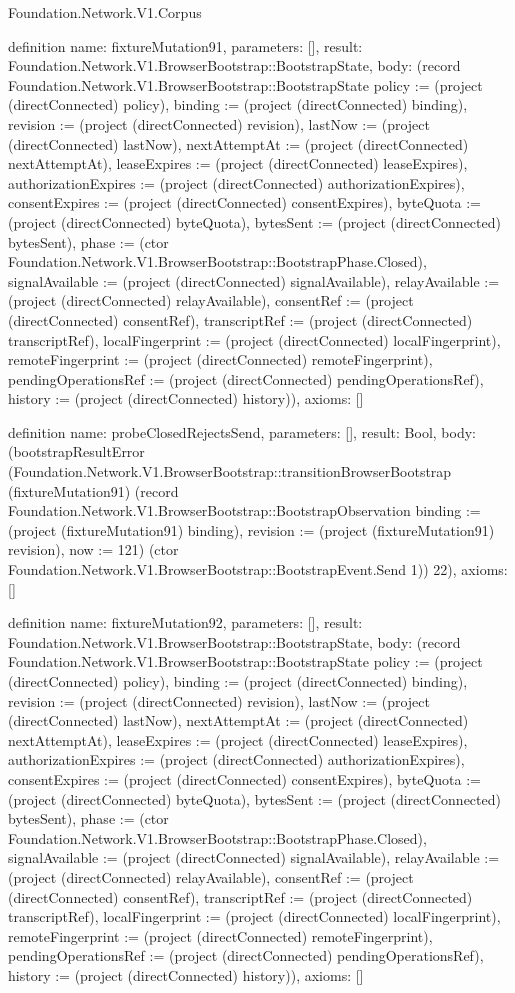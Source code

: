 \begin{lexlean}{Foundation.Network.V1.Corpus}
\begin{semanticmodule}
definition{
  name: fixtureMutation91,
  parameters: [],
  result: Foundation.Network.V1.BrowserBootstrap::BootstrapState,
  body: (record Foundation.Network.V1.BrowserBootstrap::BootstrapState {policy := (project (directConnected) policy), binding := (project (directConnected) binding), revision := (project (directConnected) revision), lastNow := (project (directConnected) lastNow), nextAttemptAt := (project (directConnected) nextAttemptAt), leaseExpires := (project (directConnected) leaseExpires), authorizationExpires := (project (directConnected) authorizationExpires), consentExpires := (project (directConnected) consentExpires), byteQuota := (project (directConnected) byteQuota), bytesSent := (project (directConnected) bytesSent), phase := (ctor Foundation.Network.V1.BrowserBootstrap::BootstrapPhase.Closed), signalAvailable := (project (directConnected) signalAvailable), relayAvailable := (project (directConnected) relayAvailable), consentRef := (project (directConnected) consentRef), transcriptRef := (project (directConnected) transcriptRef), localFingerprint := (project (directConnected) localFingerprint), remoteFingerprint := (project (directConnected) remoteFingerprint), pendingOperationsRef := (project (directConnected) pendingOperationsRef), history := (project (directConnected) history)}),
  axioms: []
}

definition{
  name: probeClosedRejectsSend,
  parameters: [],
  result: Bool,
  body: (bootstrapResultError (Foundation.Network.V1.BrowserBootstrap::transitionBrowserBootstrap (fixtureMutation91) (record Foundation.Network.V1.BrowserBootstrap::BootstrapObservation {binding := (project (fixtureMutation91) binding), revision := (project (fixtureMutation91) revision), now := 121}) (ctor Foundation.Network.V1.BrowserBootstrap::BootstrapEvent.Send 1)) 22),
  axioms: []
}

definition{
  name: fixtureMutation92,
  parameters: [],
  result: Foundation.Network.V1.BrowserBootstrap::BootstrapState,
  body: (record Foundation.Network.V1.BrowserBootstrap::BootstrapState {policy := (project (directConnected) policy), binding := (project (directConnected) binding), revision := (project (directConnected) revision), lastNow := (project (directConnected) lastNow), nextAttemptAt := (project (directConnected) nextAttemptAt), leaseExpires := (project (directConnected) leaseExpires), authorizationExpires := (project (directConnected) authorizationExpires), consentExpires := (project (directConnected) consentExpires), byteQuota := (project (directConnected) byteQuota), bytesSent := (project (directConnected) bytesSent), phase := (ctor Foundation.Network.V1.BrowserBootstrap::BootstrapPhase.Closed), signalAvailable := (project (directConnected) signalAvailable), relayAvailable := (project (directConnected) relayAvailable), consentRef := (project (directConnected) consentRef), transcriptRef := (project (directConnected) transcriptRef), localFingerprint := (project (directConnected) localFingerprint), remoteFingerprint := (project (directConnected) remoteFingerprint), pendingOperationsRef := (project (directConnected) pendingOperationsRef), history := (project (directConnected) history)}),
  axioms: []
}


\end{semanticmodule}
\end{lexlean}
